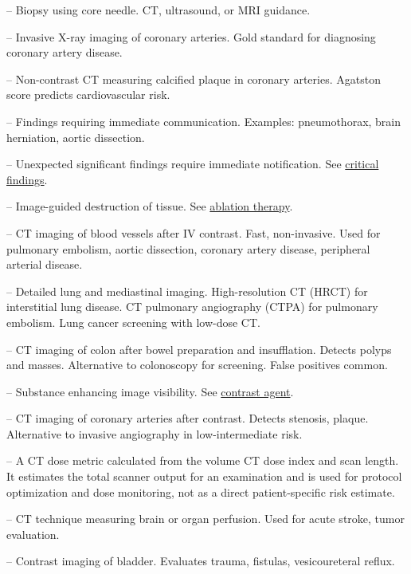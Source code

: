 -- Biopsy using core needle. CT, ultrasound, or MRI guidance.

-- Invasive X-ray imaging of coronary arteries. Gold standard for diagnosing coronary artery disease.

-- Non-contrast CT measuring calcified plaque in coronary arteries. Agatston score predicts cardiovascular risk.

-- Findings requiring immediate communication. Examples: pneumothorax, brain herniation, aortic dissection.

-- Unexpected significant findings require immediate notification. See \hyperlink{Critical Findings}{critical findings}.

-- Image-guided destruction of tissue. See \hyperlink{Ablation Therapy}{ablation therapy}.

-- CT imaging of blood vessels after IV contrast. Fast, non-invasive. Used for pulmonary embolism, aortic dissection, coronary artery disease, peripheral arterial disease.

-- Detailed lung and mediastinal imaging. High-resolution CT (HRCT) for interstitial lung disease. CT pulmonary angiography (CTPA) for pulmonary embolism. Lung cancer screening with low-dose CT.

-- CT imaging of colon after bowel preparation and insufflation. Detects polyps and masses. Alternative to colonoscopy for screening. False positives common.

-- Substance enhancing image visibility. See \hyperlink{Contrast Agent}{contrast agent}.

-- CT imaging of coronary arteries after contrast. Detects stenosis, plaque. Alternative to invasive angiography in low-intermediate risk.

-- A CT dose metric calculated from the volume CT dose index and scan length. It estimates the total scanner output for an examination and is used for protocol optimization and dose monitoring, not as a direct patient-specific risk estimate.

-- CT technique measuring brain or organ perfusion. Used for acute stroke, tumor evaluation.

-- Contrast imaging of bladder. Evaluates trauma, fistulas, vesicoureteral reflux.

